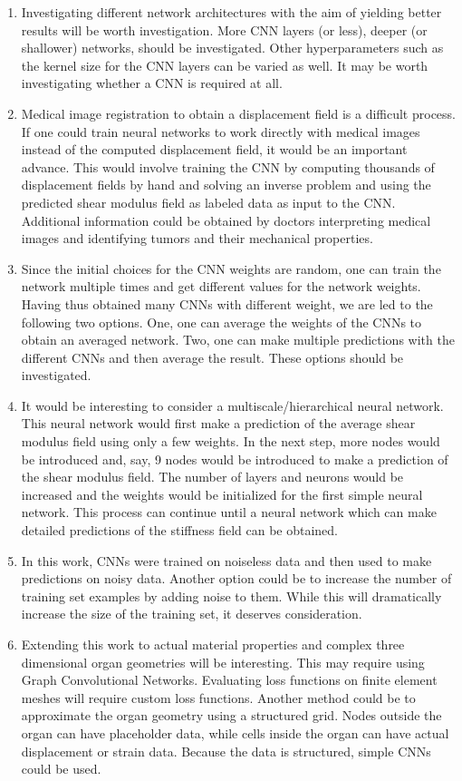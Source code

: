 \documentclass[12pt]{article}
\begin{document}
\begin{enumerate}
\item{Investigating different network architectures with the aim of yielding better results will be worth investigation. More CNN layers (or less), deeper (or shallower) networks, should be investigated. Other hyperparameters such as the kernel size for the CNN layers can be varied as well. It may be worth investigating whether a CNN is required at all.}
\item{Medical image registration to obtain a displacement field is a difficult process. If one could train neural networks to work directly with medical images instead of the computed displacement field, it would be an important advance. This would involve training the CNN by computing thousands of displacement fields by hand and solving an inverse problem and using the predicted shear modulus field as labeled data as input to the CNN. Additional information could be obtained by doctors interpreting medical images and identifying tumors and their mechanical properties.}
\item{Since the initial choices for the CNN weights are random, one can train the network multiple times and get different values for the network weights. Having thus obtained many CNNs with different weight, we are led to the following two options. One, one can average the weights of the CNNs to obtain an averaged network. Two, one can make multiple predictions with the different CNNs and then average the result. These options should be investigated.}
\item{It would be interesting to consider a multiscale/hierarchical neural network. This neural network would first make a prediction of the average shear modulus field using only a few weights. In the next step, more nodes would be introduced and, say, 9 nodes would be introduced to make a prediction of the shear modulus field. The number of layers and neurons would be increased and the weights would be initialized for the first simple neural network. This process can continue until a neural network which can make detailed predictions of the stiffness field can be obtained. }
\item{In this work, CNNs were trained on noiseless data and then used to make predictions on noisy data. Another option could be to increase the number of training set examples by adding noise to them. While this will dramatically increase the size of the training set, it deserves consideration.}
\item{Extending this work to actual material properties and complex three dimensional organ geometries will be interesting. This may require using Graph Convolutional Networks. Evaluating loss functions on finite element meshes will require custom loss functions. Another method could be to approximate the organ geometry using a structured grid. Nodes outside the organ can have placeholder data, while cells inside the organ can have actual displacement or strain data. Because the data is structured, simple CNNs could be used.}

\end{enumerate}
\end{document}
